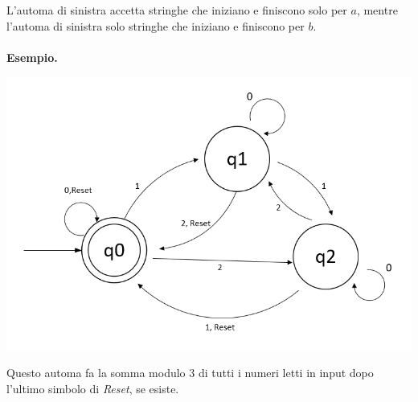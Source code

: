 \documentclass[italian]{article}
\newcommand{\example}{\noindent\textbf{Esempio.\quad}}
\begin{document}
L'automa di sinistra accetta stringhe che iniziano e finiscono solo per $a$, mentre l'automa di sinistra solo stringhe che iniziano e finiscono per $b$.\\\\
\example
\begin{center}
	\includegraphics[width=0.5\linewidth]{images/automa6}
\end{center}
Questo automa fa la somma modulo $3$ di tutti i numeri letti in input dopo l'ultimo simbolo di \textit{Reset}, se esiste. 
\end{document}
